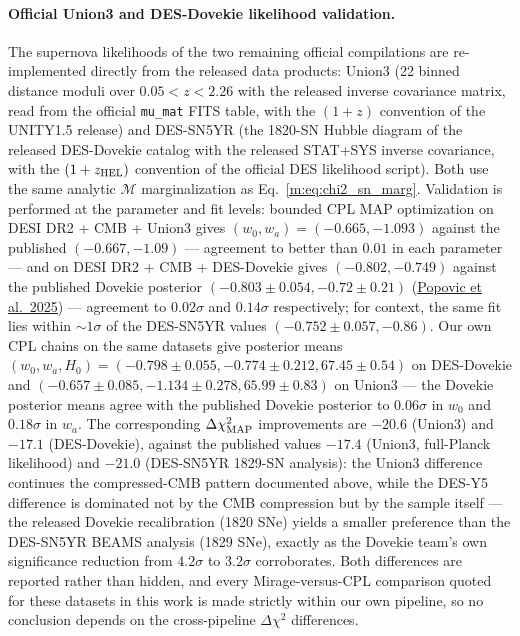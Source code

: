 \documentclass[aps,prd,preprint,superscriptaddress,nofootinbib]{revtex4-2}
\begin{document}
\paragraph{Official Union3 and DES-Dovekie likelihood validation.} The supernova likelihoods of the two remaining official compilations are re-implemented directly from the released data products: Union3 (22 binned distance moduli over $0.05 < z < 2.26$ with the released inverse covariance matrix, read from the official \texttt{mu\_mat} FITS table, with the $(1+z)$ convention of the UNITY1.5 release) and DES-SN5YR (the 1820-SN Hubble diagram of the released DES-Dovekie catalog with the released STAT+SYS inverse covariance, with the $(1+z_{\rm HEL})$ convention of the official DES likelihood script). Both use the same analytic $\mathcal{M}$ marginalization as Eq.~\ref{m:eq:chi2_sn_marg}. Validation is performed at the parameter and fit levels: bounded CPL MAP optimization on DESI DR2 + CMB + Union3 gives $(w_0, w_a) = (-0.665, -1.093)$ against the published $(-0.667, -1.09)$ --- agreement to better than $0.01$ in each parameter --- and on DESI DR2 + CMB + DES-Dovekie gives $(-0.802, -0.749)$ against the published Dovekie posterior $(-0.803 \pm 0.054, -0.72 \pm 0.21)$ (\href{https://arxiv.org/abs/2511.07517}{Popovic et al.\ 2025}) --- agreement to $0.02\sigma$ and $0.14\sigma$ respectively; for context, the same fit lies within $\sim 1\sigma$ of the DES-SN5YR values $(-0.752 \pm 0.057, -0.86)$. Our own CPL chains on the same datasets give posterior means $(w_0, w_a, H_0) = (-0.798 \pm 0.055, -0.774 \pm 0.212, 67.45 \pm 0.54)$ on DES-Dovekie and $(-0.657 \pm 0.085, -1.134 \pm 0.278, 65.99 \pm 0.83)$ on Union3 --- the Dovekie posterior means agree with the published Dovekie posterior to $0.06\sigma$ in $w_0$ and $0.18\sigma$ in $w_a$. The corresponding $\Delta\chi^2_{\rm MAP}$ improvements are $-20.6$ (Union3) and $-17.1$ (DES-Dovekie), against the published values $-17.4$ (Union3, full-Planck likelihood) and $-21.0$ (DES-SN5YR 1829-SN analysis): the Union3 difference continues the compressed-CMB pattern documented above, while the DES-Y5 difference is dominated not by the CMB compression but by the sample itself --- the released Dovekie recalibration (1820 SNe) yields a smaller preference than the DES-SN5YR BEAMS analysis (1829 SNe), exactly as the Dovekie team's own significance reduction from $4.2\sigma$ to $3.2\sigma$ corroborates. Both differences are reported rather than hidden, and every Mirage-versus-CPL comparison quoted for these datasets in this work is made strictly within our own pipeline, so no conclusion depends on the cross-pipeline $\Delta\chi^2$ differences.
\end{document}
